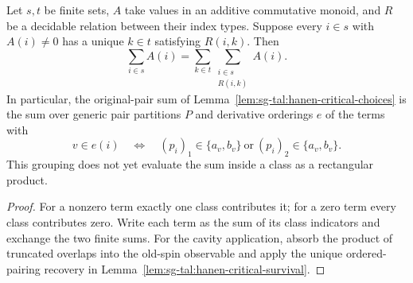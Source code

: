 \begin{lemma}\label{lem:sg-tal:hanen-pairing-fibers}
\leanok
{}
Let $s,t$ be finite sets, $A$ take values in an additive commutative monoid,
and $R$ be a decidable relation between their index types. Suppose every
$i\in s$ with $A(i)\ne0$ has a unique $k\in t$ satisfying $R(i,k)$. Then
\[
 \sum_{i\in s} A(i)=\sum_{k\in t}\sum_{\substack{i\in s\\R(i,k)}}A(i).
\]
In particular, the original-pair sum of
Lemma~\ref{lem:sg-tal:hanen-critical-choices} is the sum over generic pair
partitions $P$ and derivative orderings $e$ of the terms with
\[
 v\in e(i)\quad\Longleftrightarrow\quad
 (p_i)_1\in\{a_v,b_v\}\ \text{or}\ (p_i)_2\in\{a_v,b_v\}.
\]
This grouping does not yet evaluate the sum inside a class as a rectangular product.
\end{lemma}
\begin{proof}
\leanok
For a nonzero term exactly one class contributes it; for a zero term every class
contributes zero. Write each term as the sum of its class indicators and exchange
the two finite sums. For the cavity application, absorb the product of truncated
overlaps into the old-spin observable and apply the unique ordered-pairing
recovery in Lemma~\ref{lem:sg-tal:hanen-critical-survival}.
\end{proof}

